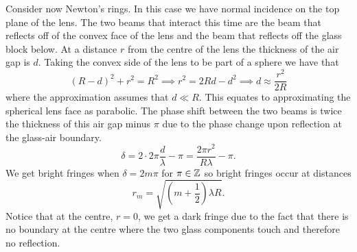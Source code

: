     Consider now Newton's rings.
    In this case we have normal incidence on the top plane of the lens.
    The two beams that interact this time are the beam that reflects off of the convex face of the lens and the beam that reflects off the glass block below.
    At a distance \(r\) from the centre of the lens the thickness of the air gap is \(d\).
    Taking the convex side of the lens to be part of a sphere we have that
    \[(R - d)^2 + r^2 = R^2 \implies r^2 = 2Rd - d^2 \implies d \approx \frac{r^2}{2R}\]
    where the approximation assumes that \(d \ll R\).
    This equates to approximating the spherical lens face as parabolic.
    The phase shift between the two beams is twice the thickness of this air gap minus \(\pi\) due to the phase change upon reflection at the glass-air boundary.
    \[\delta = 2 \cdot 2\pi\frac{d}{\lambda} - \pi = \frac{2\pi r^2}{R\lambda} - \pi.\]
    We get bright fringes when \(\delta = 2m\pi\) for \(\pi\in\mathbb{Z}\) so bright fringes occur at distances
    \[r_m = \sqrt{\left( m + \frac{1}{2} \right)\lambda R}.\]
    Notice that at the centre, \(r = 0\), we get a dark fringe due to the fact that there is no boundary at the centre where the two glass components touch and therefore no reflection.
